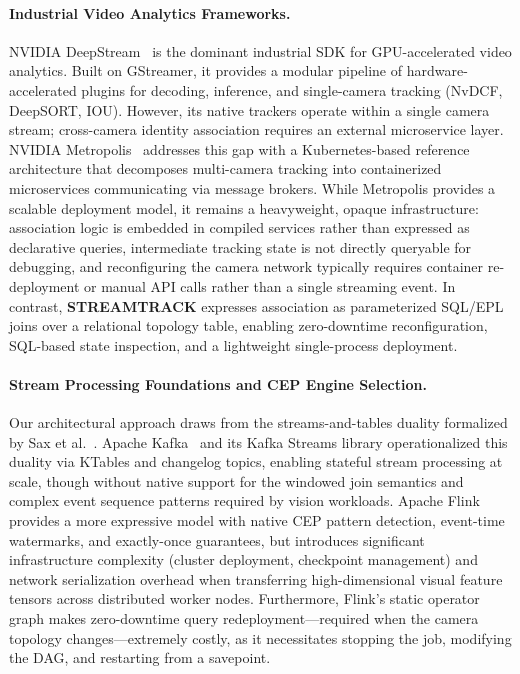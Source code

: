 \documentclass[review]{elsarticle}
\begin{document}
\paragraph{Industrial Video Analytics Frameworks.}
NVIDIA DeepStream~\cite{nvidia2024deepstream} is the dominant industrial SDK for GPU-accelerated video analytics. Built on GStreamer, it provides a modular pipeline of hardware-accelerated plugins for decoding, inference, and single-camera tracking (NvDCF, DeepSORT, IOU). However, its native trackers operate within a single camera stream; cross-camera identity association requires an external microservice layer. NVIDIA Metropolis~\cite{nvidia2025metropolis} addresses this gap with a Kubernetes-based reference architecture that decomposes multi-camera tracking into containerized microservices communicating via message brokers. While Metropolis provides a scalable deployment model, it remains a heavyweight, opaque infrastructure: association logic is embedded in compiled services rather than expressed as declarative queries, intermediate tracking state is not directly queryable for debugging, and reconfiguring the camera network typically requires container re-deployment or manual API calls rather than a single streaming event. In contrast, \textbf{STREAMTRACK} expresses association as parameterized SQL/EPL joins over a relational topology table, enabling zero-downtime reconfiguration, SQL-based state inspection, and a lightweight single-process deployment.

\paragraph{Stream Processing Foundations and CEP Engine Selection.}
Our architectural approach draws from the streams-and-tables duality formalized by Sax et al.~\cite{sax2018streams}. Apache Kafka~\cite{kreps2011kafka} and its Kafka Streams library operationalized this duality via KTables and changelog topics, enabling stateful stream processing at scale, though without native support for the windowed join semantics and complex event sequence patterns required by vision workloads. Apache Flink~\cite{carbone2015flink} provides a more expressive model with native CEP pattern detection, event-time watermarks, and exactly-once guarantees, but introduces significant infrastructure complexity (cluster deployment, checkpoint management) and network serialization overhead when transferring high-dimensional visual feature tensors across distributed worker nodes. Furthermore, Flink's static operator graph makes zero-downtime query redeployment---required when the camera topology changes---extremely costly, as it necessitates stopping the job, modifying the DAG, and restarting from a savepoint.
\end{document}
